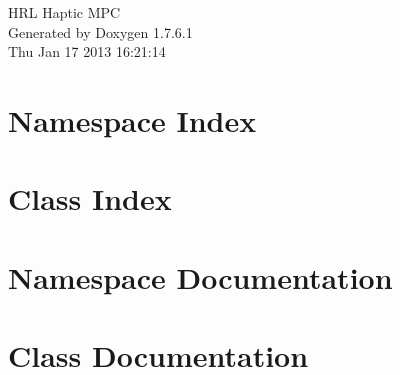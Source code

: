 \documentclass[a4paper]{book}
\begin{document}
\hypersetup{pageanchor=false,citecolor=blue}
\begin{titlepage}
\vspace*{7cm}
\begin{center}
{\Large \-H\-R\-L \-Haptic \-M\-P\-C }\\
\vspace*{1cm}
{\large \-Generated by Doxygen 1.7.6.1}\\
\vspace*{0.5cm}
{\small Thu Jan 17 2013 16:21:14}\\
\end{center}
\end{titlepage}
\clearemptydoublepage
{}
\tableofcontents
\clearemptydoublepage
{}
\hypersetup{pageanchor=true,citecolor=blue}
\chapter{\-Namespace \-Index}

\chapter{\-Class \-Index}

\chapter{\-Namespace \-Documentation}

\chapter{\-Class \-Documentation}














\printindex
\end{document}
